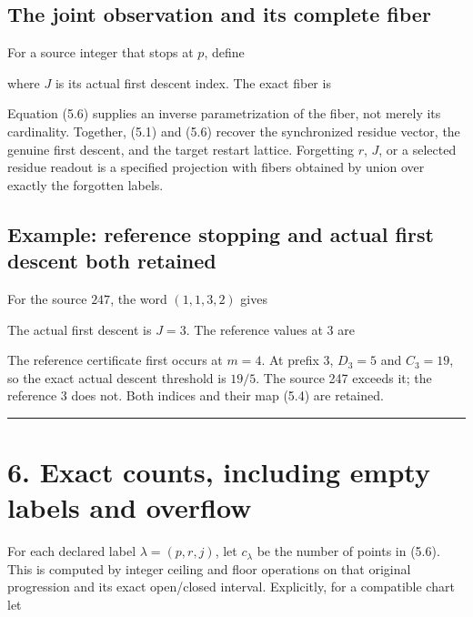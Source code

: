 \subsection{The joint observation and its complete fiber}

For a source integer that stops at \(p\), define


where \(J\) is its actual first descent index. The exact fiber is


Equation (5.6) supplies an inverse parametrization of the fiber, not
merely its cardinality. Together, (5.1) and (5.6) recover the
synchronized residue vector, the genuine first descent, and the target
restart lattice. Forgetting \(r\), \(J\), or a selected residue readout
is a specified projection with fibers obtained by union over exactly the
forgotten labels.

\subsection{Example: reference stopping and actual first descent both
retained}

For the source \(247\), the word \((1,1,3,2)\) gives


The actual first descent is \(J=3\). The reference values at 3 are

\SourceMath{3\to5\to8\to25/8\to83/32.}{}

The reference certificate first occurs at \(m=4\). At prefix 3,
\(D_3=5\) and \(C_3=19\), so the exact actual descent threshold is
\(19/5\). The source 247 exceeds it; the reference 3 does not. Both
indices and their map (5.4) are retained.

\begin{center}\rule{0.5\linewidth}{0.5pt}\end{center}

\section{6. Exact counts, including empty labels and overflow}

For each declared label \(\lambda=(p,r,j)\), let \(c_\lambda\) be the
number of points in (5.6). This is computed by integer ceiling and floor
operations on that original progression and its exact open/closed
interval. Explicitly, for a compatible chart let

